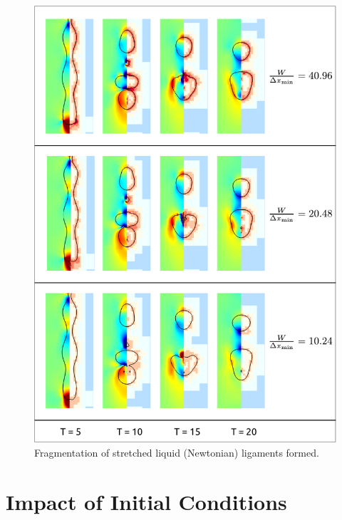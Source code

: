 \begin{figure}
\centering
\includegraphics{plots/ligament_breakup/resolution_compare.pdf}
\caption{Fragmentation of stretched liquid (Newtonian) ligaments formed. 
	}
\label{res_comp}
\end{figure}



\section{Impact of Initial Conditions}







